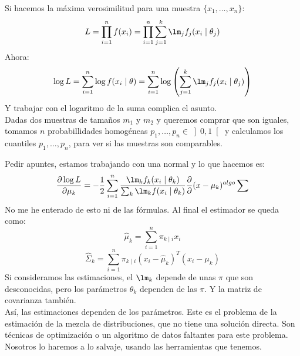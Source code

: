 \noindent
Si hacemos la máxima verosimilitud para una muestra $\{x_1,\ldots,x_n\}$:
\begin{equation*}
    L = \prod_{i=1}^n f(x_i) = \prod_{i=1}^{n}\sum_{j=1}^{k}\lm_j f_j(x_i\mid \theta_j)
\end{equation*}
Ahora:
\begin{equation*}
    \log L = \sum_{i=1}^{n}\log f(x_i\mid \theta) = \sum_{i=1}^{n}\log\left(\sum_{j=1}^{k}\lm_j f_j(x_i\mid \theta_j)\right)
\end{equation*}
Y trabajar con el logaritmo de la suma complica el asunto.\\

\noindent
Dadas dos muestras de tamaños $m_1$ y $m_2$ y queremos comprar que son iguales, tomamos $n$ probabillidades homogéneas $p_1,\ldots,p_n \in \left]0,1\right[$ y calculamos los cuantiles $p_1,\ldots,p_n$, para ver si las muestras son comparables.


\noindent
Pedir apuntes, estamos trabajando con una normal y lo que hacemos es:
\begin{equation*}
    \frac{\partial \log L}{\partial \mu_k} = -\frac{1}{2} \sum_{i=1}^{n}\frac{\lm_k f_k(x_i\mid \theta_k)}{\sum_{k}\lm_k f(x_i\mid \theta_k)} \frac{\partial }{\partial } (x-\mu_k)^{algo} \sum
\end{equation*}
No me he enterado de esto ni de las fórmulas. Al final el estimador se queda como:
\begin{equation*}
    \hat{\mu}_k = \sum_{i=1}^{n} \pi_{k\mid i} x_i
\end{equation*}
\begin{equation*}
    \hat{\Sigma}_k = \sum_{i=1}^{n}\pi_{k\mid i}(x_i-\hat{\mu}_k)^T(x_i-\mu_k)
\end{equation*}
Si consideramos las estimaciones, el $\lm_k$ depende de unas $\pi$ que son desconocidas, pero los parámetros $\theta_k$ dependen de las $\pi$. Y la matriz de covarianza también.\\

\noindent
Así, las estimaciones dependen de los parámetros. Este es el problema de la estimación de la mezcla de distribuciones, que no tiene una solución directa. Son técnicas de optimización o un algoritmo de datos faltantes para este problema. Nosotros lo haremos a lo salvaje, usando las herramientas que tenemos.

